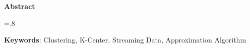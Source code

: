 


\pagestyle{empty}

\begin{latin}

\begin{center}
\textbf{Abstract}
\end{center}
\baselineskip=.8\baselineskip

\TODO

\bigskip\noindent\textbf{Keywords}:
Clustering, K-Center, Streaming Data, Approximation Algorithm

\end{latin}

\newpage
